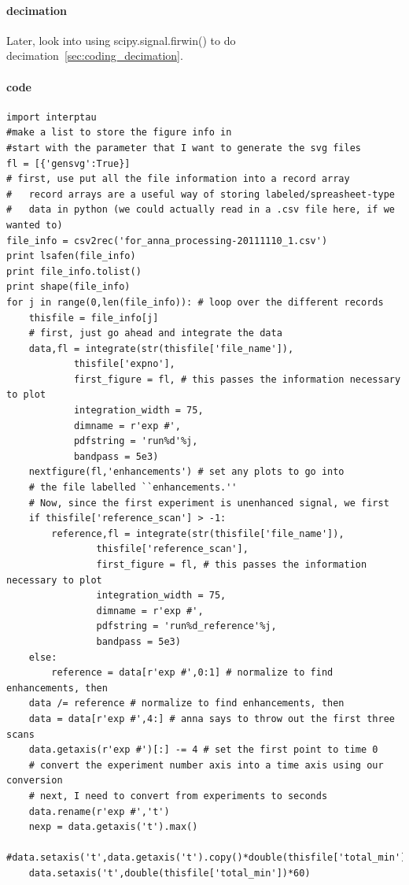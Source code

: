 \paragraph{decimation}
Later, look into using scipy.signal.firwin() to do decimation~\ref{sec:coding_decimation}.
\paragraph{code}
\begin{lstlisting}
import interptau
#make a list to store the figure info in
#start with the parameter that I want to generate the svg files
fl = [{'gensvg':True}]
# first, use put all the file information into a record array
#   record arrays are a useful way of storing labeled/spreasheet-type
#   data in python (we could actually read in a .csv file here, if we wanted to)
file_info = csv2rec('for_anna_processing-20111110_1.csv')
print lsafen(file_info)
print file_info.tolist()
print shape(file_info)
for j in range(0,len(file_info)): # loop over the different records
    thisfile = file_info[j]
    # first, just go ahead and integrate the data
    data,fl = integrate(str(thisfile['file_name']),
            thisfile['expno'],
            first_figure = fl, # this passes the information necessary to plot
            integration_width = 75,
            dimname = r'exp #',
            pdfstring = 'run%d'%j,
            bandpass = 5e3)
    nextfigure(fl,'enhancements') # set any plots to go into
    # the file labelled ``enhancements.''
    # Now, since the first experiment is unenhanced signal, we first
    if thisfile['reference_scan'] > -1:
        reference,fl = integrate(str(thisfile['file_name']),
                thisfile['reference_scan'],
                first_figure = fl, # this passes the information necessary to plot
                integration_width = 75,
                dimname = r'exp #',
                pdfstring = 'run%d_reference'%j,
                bandpass = 5e3)
    else:
        reference = data[r'exp #',0:1] # normalize to find enhancements, then
    data /= reference # normalize to find enhancements, then
    data = data[r'exp #',4:] # anna says to throw out the first three scans
    data.getaxis(r'exp #')[:] -= 4 # set the first point to time 0
    # convert the experiment number axis into a time axis using our conversion
    # next, I need to convert from experiments to seconds
    data.rename(r'exp #','t')
    nexp = data.getaxis('t').max()
    #data.setaxis('t',data.getaxis('t').copy()*double(thisfile['total_min'])*60/nexp)
    data.setaxis('t',double(thisfile['total_min'])*60)

\end{lstlisting}
